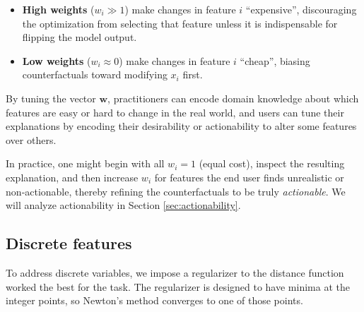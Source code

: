 \documentclass[12pt]{extarticle}
\numberwithin{equation}{section}
\begin{document}
\begin{itemize}
  \item \textbf{High weights} (\(w_i \!\!\gg\! 1\)) make changes in feature \(i\) “expensive”, discouraging the optimization from selecting that feature unless it is indispensable for flipping the model output.
  \item \textbf{Low weights} (\(w_i \!\!\approx\! 0\)) make changes in feature \(i\) “cheap”, biasing counterfactuals toward modifying \(x_i\) first.
\end{itemize}

By tuning the vector \(\mathbf{w}\), practitioners can encode domain knowledge about which features are easy or hard to change in the real world, and users can tune their explanations by encoding their desirability or actionability to alter some features over others.

In practice, one might begin with all $w_i = 1$ (equal cost), inspect the resulting explanation, and then increase $w_i$ for features the end user finds unrealistic or non‐actionable, thereby refining the counterfactuals to be truly \emph{actionable}. We will analyze actionability in Section \ref{sec:actionability}.

\subsection{Discrete features}\label{sec:discrete}
To address discrete variables, we impose a regularizer to the distance function worked the best for the task. The regularizer is designed to have minima at the integer points, so Newton's method converges to one of those points.
\end{document}
